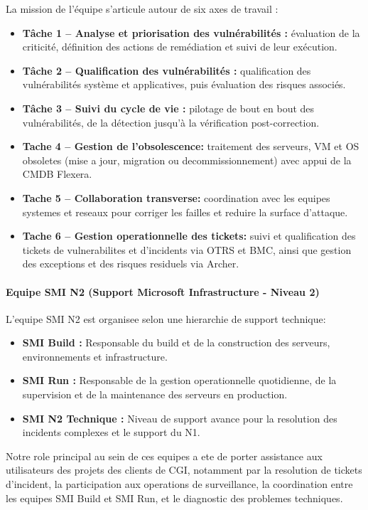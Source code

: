 La mission de l'équipe s'articule autour de six axes de travail :
\begin{itemize}
  \item \textbf{Tâche 1 -- Analyse et priorisation des vulnérabilités :} évaluation de la criticité, définition des actions de remédiation et suivi de leur exécution.
  \item \textbf{Tâche 2 -- Qualification des vulnérabilités :} qualification des vulnérabilités système et applicatives, puis évaluation des risques associés.
  \item \textbf{Tâche 3 -- Suivi du cycle de vie :} pilotage de bout en bout des vulnérabilités, de la détection jusqu'à la vérification post-correction.
  \item \textbf{Tache 4 -- Gestion de l'obsolescence:} traitement des serveurs, VM et OS obsoletes (mise a jour, migration ou decommissionnement) avec appui de la CMDB Flexera.
  \item \textbf{Tache 5 -- Collaboration transverse:} coordination avec les equipes systemes et reseaux pour corriger les failles et reduire la surface d'attaque.
  \item \textbf{Tache 6 -- Gestion operationnelle des tickets:} suivi et qualification des tickets de vulnerabilites et d'incidents via OTRS et BMC, ainsi que gestion des exceptions et des risques residuels via Archer.
\end{itemize}

\paragraph{Equipe SMI N2 (Support Microsoft Infrastructure - Niveau 2)}
L'equipe SMI N2 est organisee selon une hierarchie de support technique:

\begin{itemize}
  \item \textbf{SMI Build :} Responsable du build et de la construction des serveurs, environnements et infrastructure.
  \item \textbf{SMI Run :} Responsable de la gestion operationnelle quotidienne, de la supervision et de la maintenance des serveurs en production.
  \item \textbf{SMI N2 Technique :} Niveau de support avance pour la resolution des incidents complexes et le support du N1.
\end{itemize}

Notre role principal au sein de ces equipes a ete de porter assistance aux utilisateurs des projets des clients de CGI, notamment par la resolution de tickets d'incident, la participation aux operations de surveillance, la coordination entre les equipes SMI Build et SMI Run, et le diagnostic des problemes techniques.

